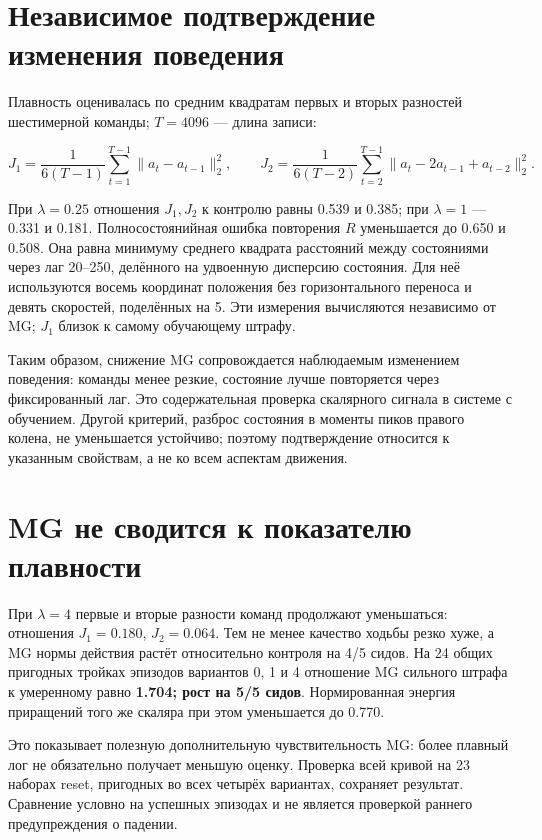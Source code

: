 \documentclass[10pt,a4paper]{article}
\begin{document}
\section*{Независимое подтверждение изменения поведения}

Плавность оценивалась по средним квадратам первых и вторых разностей шестимерной команды; $T=4096$ --- длина записи:

\[
J_1=\frac{1}{6(T-1)}\sum_{t=1}^{T-1}\|a_t-a_{t-1}\|_2^2,\qquad
J_2=\frac{1}{6(T-2)}\sum_{t=2}^{T-1}\|a_t-2a_{t-1}+a_{t-2}\|_2^2.
\]

При $\lambda=0.25$ отношения $J_1,J_2$ к контролю равны 0.539 и 0.385; при $\lambda=1$ --- 0.331 и 0.181. Полносостоянийная ошибка повторения $R$ уменьшается до 0.650 и 0.508. Она равна минимуму среднего квадрата расстояний между состояниями через лаг 20--250, делённого на удвоенную дисперсию состояния. Для неё используются восемь координат положения без горизонтального переноса и девять скоростей, поделённых на 5. Эти измерения вычисляются независимо от MG; $J_1$ близок к самому обучающему штрафу.

Таким образом, снижение MG сопровождается наблюдаемым изменением поведения: команды менее резкие, состояние лучше повторяется через фиксированный лаг. Это содержательная проверка скалярного сигнала в системе с обучением. Другой критерий, разброс состояния в моменты пиков правого колена, не уменьшается устойчиво; поэтому подтверждение относится к указанным свойствам, а не ко всем аспектам движения.

\section*{MG не сводится к показателю плавности}

При $\lambda=4$ первые и вторые разности команд продолжают уменьшаться: отношения $J_1=0.180$, $J_2=0.064$. Тем не менее качество ходьбы резко хуже, а MG нормы действия растёт относительно контроля на 4/5 сидов. На 24 общих пригодных тройках эпизодов вариантов 0, 1 и 4 отношение MG сильного штрафа к умеренному равно \textbf{1.704; рост на 5/5 сидов}. Нормированная энергия приращений того же скаляра при этом уменьшается до 0.770.

Это показывает полезную дополнительную чувствительность MG: более плавный лог не обязательно получает меньшую оценку. Проверка всей кривой на 23 наборах reset, пригодных во всех четырёх вариантах, сохраняет результат. Сравнение условно на успешных эпизодах и не является проверкой раннего предупреждения о падении.
\end{document}
